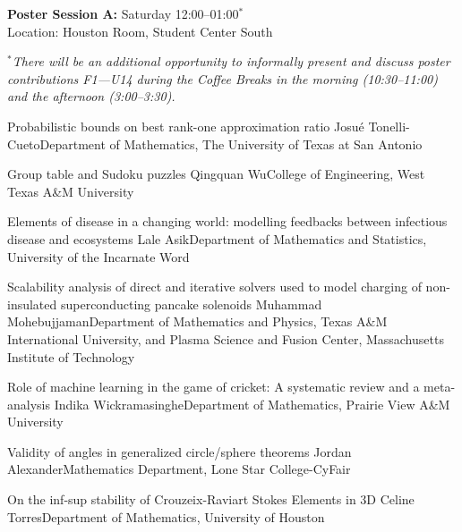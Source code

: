 
\begin{center}
{\large {\bf Poster Session A:} Saturday 12:00--01:00$^\ast$\\
Location: Houston Room, Student Center South}
\end{center}

\noindent $^\ast${\it There will be an additional opportunity to informally present and discuss poster contributions F1---U14 during the Coffee Breaks in the morning (10:30--11:00) and the afternoon (3:00--3:30).}
\vspace{1ex}

\begin{postersPF}
\label{poster}

\item\poster %
{Probabilistic bounds on best rank-one approximation ratio}
{Josu\'e Tonelli-Cueto}{Department of Mathematics, The University of Texas at San Antonio}

\item\poster %
{Group table and Sudoku puzzles}
{Qingquan Wu}{College of Engineering, West Texas A\&M University}

\item\poster %
{Elements of disease in a changing world: modelling feedbacks between infectious disease and ecosystems}
{Lale Asik}{Department of Mathematics and Statistics, University of the Incarnate Word}

\item\poster %
{Scalability analysis of direct and iterative solvers used to model charging of non-insulated superconducting pancake solenoids}
{Muhammad Mohebujjaman}{Department of Mathematics and Physics, Texas A\&M International University, and Plasma Science and Fusion Center, Massachusetts Institute of Technology}

\item\poster %
{Role of machine learning in the game of cricket: A systematic review and a meta-analysis}
{Indika Wickramasinghe}{Department of Mathematics, Prairie View A\&M University}

\item\poster %
{Validity of angles in generalized circle/sphere theorems}
{Jordan Alexander}{Mathematics Department, Lone Star College-CyFair}

\item\poster %
{On the inf-sup stability of Crouzeix-Raviart Stokes Elements in 3D}
{Celine Torres}{Department of Mathematics, University of Houston}


\end{postersPF}

